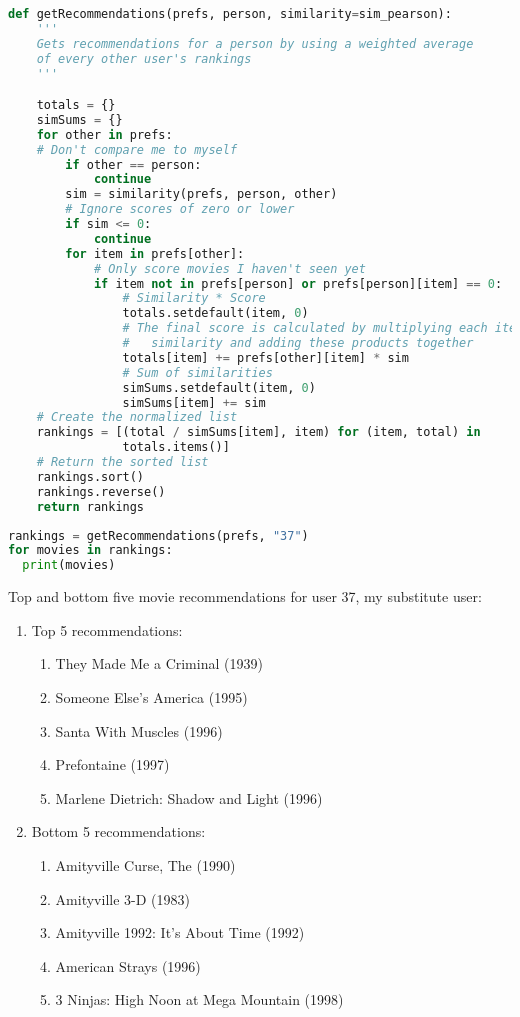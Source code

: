 \documentclass[12pt]{article}
\begin{document}
\begin{lstlisting}[language=Python, caption=getRecommendations function copy-pasted from the week-11 Colab notebook., label=lst:getreco]
def getRecommendations(prefs, person, similarity=sim_pearson):
    '''
    Gets recommendations for a person by using a weighted average
    of every other user's rankings
    '''

    totals = {}
    simSums = {}
    for other in prefs:
    # Don't compare me to myself
        if other == person:
            continue
        sim = similarity(prefs, person, other)
        # Ignore scores of zero or lower
        if sim <= 0:
            continue
        for item in prefs[other]:
            # Only score movies I haven't seen yet
            if item not in prefs[person] or prefs[person][item] == 0:
                # Similarity * Score
                totals.setdefault(item, 0)
                # The final score is calculated by multiplying each item by the
                #   similarity and adding these products together
                totals[item] += prefs[other][item] * sim
                # Sum of similarities
                simSums.setdefault(item, 0)
                simSums[item] += sim
    # Create the normalized list
    rankings = [(total / simSums[item], item) for (item, total) in
                totals.items()]
    # Return the sorted list
    rankings.sort()
    rankings.reverse()
    return rankings
\end{lstlisting}

\begin{lstlisting}[language=Python, caption=Python code to compute and print ratings for films that my substitute user has not seen., label=lst:recommendations]
rankings = getRecommendations(prefs, "37")
for movies in rankings:
  print(movies)
\end{lstlisting}
Top and bottom five movie recommendations for user 37, my substitute user:
\begin{enumerate}
    \item Top 5 recommendations:
    \begin{enumerate}
        \item They Made Me a Criminal (1939)
        \item Someone Else's America (1995)
        \item Santa With Muscles (1996)
        \item Prefontaine (1997)
        \item Marlene Dietrich: Shadow and Light (1996)
    \end{enumerate}
    \item Bottom 5 recommendations:
    \begin{enumerate}
        \item Amityville Curse, The (1990)
        \item Amityville 3-D (1983)
        \item Amityville 1992: It's About Time (1992)
        \item American Strays (1996)
        \item 3 Ninjas: High Noon at Mega Mountain (1998)
    \end{enumerate}
\end{enumerate}
\end{document}
